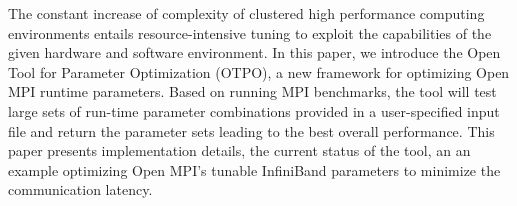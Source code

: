 The constant increase of complexity of clustered high performance
computing environments entails resource-intensive tuning to exploit
the capabilities of the given hardware and software environment. In
this paper, we introduce the Open Tool for Parameter Optimization
(OTPO), a new framework for optimizing Open MPI runtime
parameters. Based on running MPI benchmarks, the tool will test large
sets of run-time parameter combinations provided in a user-specified
input file and return the parameter sets leading to the best overall
performance. This paper presents implementation details, the current
status of the tool, an an example optimizing Open MPI's tunable
InfiniBand parameters to minimize the communication latency.
